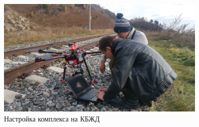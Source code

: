 \begin{figure}[h!]
  \begin{center}
    \includegraphics[width=0.9\textwidth]{authors/efremov-fig2.jpg}
  \end{center}
  \caption{Настройка комплекса на КБЖД}
  \label{fig:efremov-fig2}
\end{figure}
